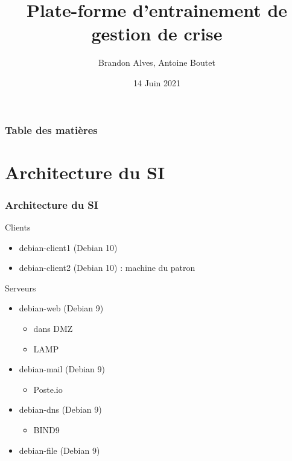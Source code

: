 \documentclass{beamer}
\title[État des lieux]{Plate-forme d'entrainement de gestion de crise}
\author{Brandon Alves, Antoine Boutet}
\institute[INSA Lyon]{
	INSA Lyon \\
	\medskip
	INRIA
}
\date{14 Juin 2021}
\begin{document}
	\begin{frame}
		\titlepage
	\end{frame}
	\begin{frame}
		\frametitle{Table des matières}
		\tableofcontents
	\end{frame}
	\section{Architecture du SI}
		\begin{frame}
			\frametitle{Architecture du SI}
			\begin{block}{Clients}
				\begin{itemize}
					\item debian-client1 (Debian 10)
					\item debian-client2 (Debian 10) : machine du patron
				\end{itemize}
			\end{block}
			\begin{block}{Serveurs}
				\begin{itemize}
					\item debian-web (Debian 9)
					\begin{itemize}
						\item dans DMZ
						\item LAMP
					\end{itemize}
					\item debian-mail (Debian 9)
					\begin{itemize}
						\item Poste.io
					\end{itemize}
					\item debian-dns (Debian 9)
					\begin{itemize}
						\item BIND9
					\end{itemize}
					\item debian-file (Debian 9)
				\end{itemize}
			\end{block}
		\end{frame}
\end{document}
